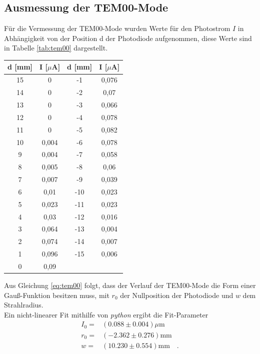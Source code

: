 \documentclass[]{scrartcl}
\begin{document}
\subsection{Ausmessung der TEM00-Mode}
Für die Vermessung der TEM00-Mode wurden Werte für den Photostrom $I$ in Abhängigkeit von der Position d der Photodiode aufgenommen, diese Werte sind in Tabelle \ref{tab:tem00} dargestellt.
\begin{center}
	\begin{tabular}{|c|c||c|c|}
		\hline d [mm] & I [$\mu$A] & d [mm] & I [$\mu$A]\\
		\hline	15	&	0	&	-1	&	0,076	\\
		\hline	14	&	0	&	-2	&	0,07	\\
		\hline	13	&	0	&	-3	&	0,066	\\
		\hline	12	&	0	&	-4	&	0,078	\\
		\hline	11	&	0	&	-5	&	0,082	\\
		\hline	10	&	0,004	&	-6	&	0,078	\\
		\hline	9	&	0,004	&	-7	&	0,058	\\
		\hline	8	&	0,005	&	-8	&	0,06	\\
		\hline	7	&	0,007	&	-9	&	0,039	\\
		\hline	6	&	0,01	&	-10	&	0,023	\\
		\hline	5	&	0,023	&	-11	&	0,023	\\
		\hline	4	&	0,03	&	-12	&	0,016	\\
		\hline	3	&	0,064	&	-13	&	0,004	\\
		\hline	2	&	0,074	&	-14	&	0,007	\\
		\hline	1	&	0,096	&	-15	&	0,006	\\
		\hline	0	&	0,09	&		&		\\
		\hline
	\end{tabular}
	\label{tab:tem00}
\end{center}
Aus Gleichung \ref{eq:tem00} folgt, dass der Verlauf der TEM00-Mode die Form einer Gauß-Funktion besitzen muss, mit $r_0$ der Nullposition der Photodiode und $w$ dem Strahlradius. \\
Ein nicht-linearer Fit mithilfe von \textit{python} ergibt die Fit-Parameter
\begin{align*}
I_0=& (0.088 \pm 0.004) \si{\mu\metre}\\
r_0=& (-2.362 \pm 0.276) \si{\milli\metre}\\
w=&  (10.230  \pm 0.554) \si{\milli\metre}\quad.
\end{align*}
\end{document}
